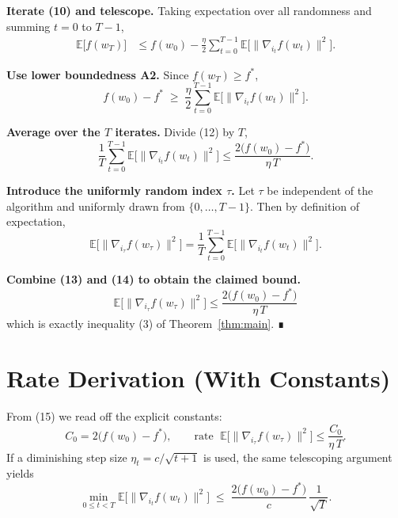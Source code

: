 \documentclass{article}
\begin{document}
\begin{enumerate}[label=\textbf{[Step \arabic*]}]
\item \textbf{Iterate (10) and telescope.}  
Taking expectation over all randomness and summing $t=0$ to $T-1$,
\[
\begin{aligned}
\mathbb{E}\!\big[f(w_{T})\big]
&\le f(w_{0}) -\frac{\eta}{2}\sum_{t=0}^{T-1}
      \mathbb{E}\!\big[\|\nabla_{i_{t}}f(w_{t})\|^{2}\big].
\end{aligned}
\tag{11}
\]

\item \textbf{Use lower boundedness \textbf{A2}.}  
Since $f(w_{T})\ge f^{*}$,
\[
f(w_{0})-f^{*}\;\ge\;
\frac{\eta}{2}\sum_{t=0}^{T-1}
      \mathbb{E}\!\big[\|\nabla_{i_{t}}f(w_{t})\|^{2}\big].
\tag{12}
\]

\item \textbf{Average over the $T$ iterates.}  
Divide (12) by $T$,
\[
\frac{1}{T}\sum_{t=0}^{T-1}
      \mathbb{E}\!\big[\|\nabla_{i_{t}}f(w_{t})\|^{2}\big]
\le \frac{2\big(f(w_{0})-f^{*}\big)}{\eta\,T}.
\tag{13}
\]

\item \textbf{Introduce the uniformly random index $\tau$.}  
Let $\tau$ be independent of the algorithm and uniformly drawn from $\{0,\dots ,T-1\}$.  
Then by definition of expectation,
\[
\mathbb{E}\!\big[\|\nabla_{i_{\tau}}f(w_{\tau})\|^{2}\big]
= \frac{1}{T}\sum_{t=0}^{T-1}
      \mathbb{E}\!\big[\|\nabla_{i_{t}}f(w_{t})\|^{2}\big].
\tag{14}
\]

\item \textbf{Combine (13) and (14) to obtain the claimed bound.}
\[
\boxed{
\mathbb{E}\!\big[\|\nabla_{i_{\tau}}f(w_{\tau})\|^{2}\big]
\le \frac{2\big(f(w_{0})-f^{*}\big)}{\eta\,T}
}
\tag{15}
\]
which is exactly inequality (3) of Theorem~\ref{thm:main}. ∎
\end{enumerate}

\section*{Rate Derivation (With Constants)}
From (15) we read off the explicit constants:
\[
C_{0}=2\big(f(w_{0})-f^{*}\big),\qquad
\text{rate } \; \mathbb{E}\!\big[\|\nabla_{i_{\tau}}f(w_{\tau})\|^{2}\big]\le \frac{C_{0}}{\eta\,T}.
\]
If a diminishing step size $\eta_{t}=c/\sqrt{t+1}$ is used, the same telescoping argument yields
\[
\min_{0\le t<T}\mathbb{E}\!\big[\|\nabla_{i_{t}}f(w_{t})\|^{2}\big]
\;\le\;
\frac{2\big(f(w_{0})-f^{*}\big)}{c}\,\frac{1}{\sqrt{T}}.
\]
\end{document}
